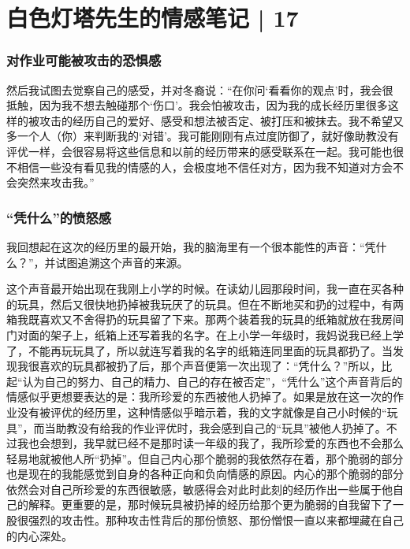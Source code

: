 \chapter{白色灯塔先生的情感笔记 | 17}





\subsection*{对作业可能被攻击的恐惧感}

然后我试图去觉察自己的感受，并对冬裔说：“在你问‘看看你的观点’时，我会很抵触，因为我不想去触碰那个‘伤口’。我会怕被攻击，因为我的成长经历里很多这样的被攻击的经历\pozhehao{}自己的爱好、感受和想法被否定、被打压和被抹去。我不希望又多一个人（你）来判断我的‘对错’。我可能刚刚有点过度防御了，就好像助教没有评优一样，会很容易将这些信息和以前的经历带来的感受联系在一起。我可能也很不相信一些没有看见我的情感的人，会极度地不信任对方，因为我不知道对方会不会突然来攻击我。”



\subsection*{“凭什么”的愤怒感}

我回想起在这次的经历里的最开始，我的脑海里有一个很本能性的声音：“凭什么？”，并试图追溯这个声音的来源。

这个声音最开始出现在我刚上小学的时候。在读幼儿园那段时间，我一直在买各种的玩具，然后又很快地扔掉被我玩厌了的玩具。但在不断地买和扔的过程中，有两箱我既喜欢又不舍得扔的玩具留了下来。那两个装着我的玩具的纸箱就放在我房间门对面的架子上，纸箱上还写着我的名字。在上小学一年级时，我妈说我已经上学了，不能再玩玩具了，所以就连写着我的名字的纸箱连同里面的玩具都扔了。当发现我很喜欢的玩具都被扔了后，那个声音便第一次出现了：“凭什么？”所以，比起“认为自己的努力、自己的精力、自己的存在被否定”，“凭什么”这个声音背后的情感似乎更想要表达的是：我所珍爱的东西被他人扔掉了。如果是放在这一次的作业没有被评优的经历里，这种情感似乎暗示着，我的文字就像是自己小时候的“玩具”，而当助教没有给我的作业评优时，我会感到自己的“玩具”被他人扔掉了。不过我也会想到，我早就已经不是那时读一年级的我了，我所珍爱的东西也不会那么轻易地就被他人所“扔掉”。但自己内心那个脆弱的我依然存在着，那个脆弱的部分也是现在的我能感觉到自身的各种正向和负向情感的原因。内心的那个脆弱的部分依然会对自己所珍爱的东西很敏感，敏感得会对此时此刻的经历作出一些属于他自己的解释。更重要的是，那时候玩具被扔掉的经历给那个更为脆弱的自我留下了一股很强烈的攻击性。那种攻击性背后的那份愤怒、那份憎恨一直以来都埋藏在自己的内心深处。

